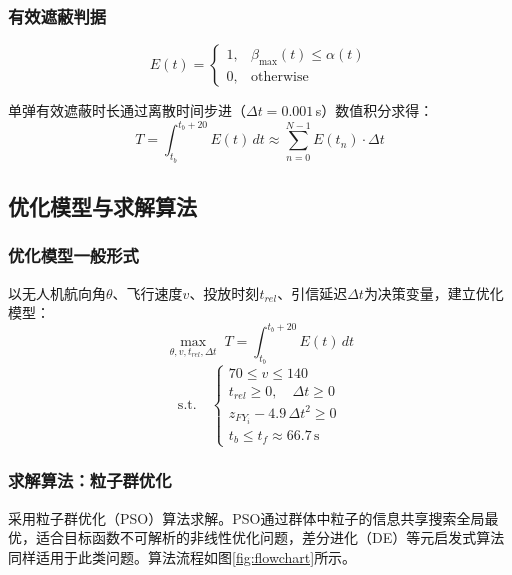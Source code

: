 \documentclass[12pt,a4paper]{article}
\begin{document}
\subsubsection{有效遮蔽判据}

\begin{equation}
\boxed{E(t) = \begin{cases} 1, & \beta_{\max}(t) \leq \alpha(t) \\ 0, & \text{otherwise} \end{cases}}
\end{equation}

单弹有效遮蔽时长通过离散时间步进（$\Delta t = 0.001$\,s）数值积分求得：
\begin{equation}
T = \int_{t_b}^{t_b + 20} E(t) \, dt \approx \sum_{n=0}^{N-1} E(t_n) \cdot \Delta t
\end{equation}

\subsection{优化模型与求解算法}

\subsubsection{优化模型一般形式}

以无人机航向角$\theta$、飞行速度$v$、投放时刻$t_{rel}$、引信延迟$\Delta t$为决策变量，建立优化模型：
\begin{equation}
\max_{\theta, v, t_{rel}, \Delta t} \; T = \int_{t_b}^{t_b+20} E(t) \, dt
\end{equation}
\begin{equation}
\text{s.t.} \quad
\begin{cases}
70 \leq v \leq 140 \\
t_{rel} \geq 0, \quad \Delta t \geq 0 \\
z_{FY_i} - 4.9\,\Delta t^2 \geq 0 \\
t_b \leq t_f \approx 66.7\,\text{s}
\end{cases}
\end{equation}

\subsubsection{求解算法：粒子群优化}

采用粒子群优化（PSO）算法求解\cite{2}。PSO通过群体中粒子的信息共享搜索全局最优，适合目标函数不可解析的非线性优化问题，差分进化（DE）等元启发式算法同样适用于此类问题\cite{3}。算法流程如图\ref{fig:flowchart}所示。
\end{document}

